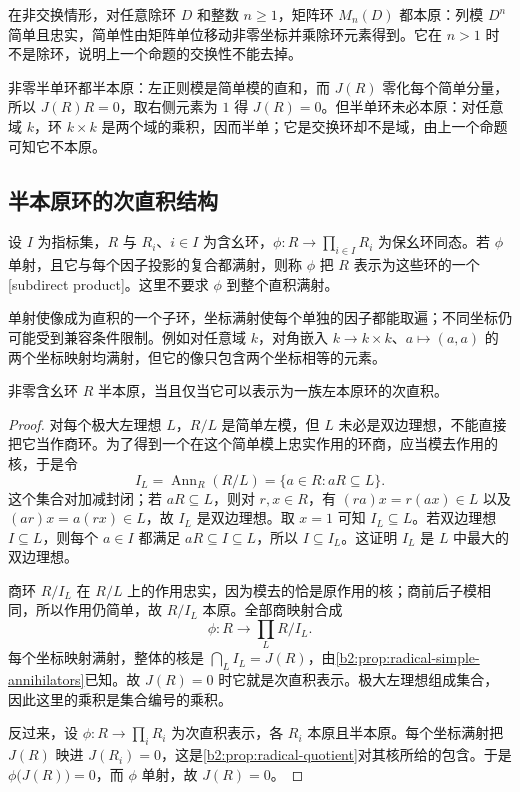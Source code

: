 在非交换情形，对任意除环 \(D\) 和整数 \(n\ge1\)，矩阵环 \(M_n(D)\) 都本原：列模 \(D^n\) 简单且忠实，简单性由矩阵单位移动非零坐标并乘除环元素得到。它在 \(n>1\) 时不是除环，说明上一个命题的交换性不能去掉。

\ProseParagraphBreak
非零半单环都半本原：左正则模是简单模的直和，而 \(J(R)\) 零化每个简单分量，所以 \(J(R)R=0\)，取右侧元素为 \(1\) 得 \(J(R)=0\)。但半单环未必本原：对任意域 \(k\)，环 \(k\times k\) 是两个域的乘积，因而半单；它是交换环却不是域，由上一个命题可知它不本原。

\subsection{半本原环的次直积结构}
\label{b2:subsec:1403:02}

\begin{definition}\label{b2:def:subdirect-product}
	设 \(I\) 为指标集，\(R\) 与 \(R_i\)、\(i\in I\) 为含幺环，\(\phi:R\to\prod_{i\in I}R_i\) 为保幺环同态。若 \(\phi\) 单射，且它与每个因子投影的复合都满射，则称 \(\phi\) 把 \(R\) 表示为这些环的一个[subdirect product]。这里不要求 \(\phi\) 到整个直积满射。
\end{definition}

单射使像成为直积的一个子环，坐标满射使每个单独的因子都能取遍；不同坐标仍可能受到兼容条件限制。例如对任意域 \(k\)，对角嵌入 \(k\to k\times k\)、\(a\mapsto(a,a)\) 的两个坐标映射均满射，但它的像只包含两个坐标相等的元素。

\begin{theorem}\label{b2:thm:semiprimitive-subdirect}
	非零含幺环 \(R\) 半本原，当且仅当它可以表示为一族左本原环的次直积。
\end{theorem}
\begin{proof}
	对每个极大左理想 \(L\)，\(R/L\) 是简单左模，但 \(L\) 未必是双边理想，不能直接把它当作商环。为了得到一个在这个简单模上忠实作用的环商，应当模去作用的核，于是令
	\[
		I_L=\operatorname{Ann}_R(R/L) =\{a\in R:aR\subseteq L\}.
	\]
	这个集合对加减封闭；若 \(aR\subseteq L\)，则对 \(r,x\in R\)，有 \((ra)x=r(ax)\in L\) 以及 \((ar)x=a(rx)\in L\)，故 \(I_L\) 是双边理想。取 \(x=1\) 可知 \(I_L\subseteq L\)。若双边理想 \(I\subseteq L\)，则每个 \(a\in I\) 都满足 \(aR\subseteq I\subseteq L\)，所以 \(I\subseteq I_L\)。这证明 \(I_L\) 是 \(L\) 中最大的双边理想。

	商环 \(R/I_L\) 在 \(R/L\) 上的作用忠实，因为模去的恰是原作用的核；商前后子模相同，所以作用仍简单，故 \(R/I_L\) 本原。全部商映射合成
	\[
		\phi:R\longrightarrow\prod_L R/I_L.
	\]
	每个坐标映射满射，整体的核是 \(\bigcap_LI_L=J(R)\)，由\cref{b2:prop:radical-simple-annihilators}已知。故 \(J(R)=0\) 时它就是次直积表示。极大左理想组成集合，因此这里的乘积是集合编号的乘积。

	反过来，设 \(\phi:R\to\prod_iR_i\) 为次直积表示，各 \(R_i\) 本原且半本原。每个坐标满射把 \(J(R)\) 映进 \(J(R_i)=0\)，这是\cref{b2:prop:radical-quotient}对其核所给的包含。于是 \(\phi\bigl(J(R)\bigr)=0\)，而 \(\phi\) 单射，故 \(J(R)=0\)。
\end{proof}

